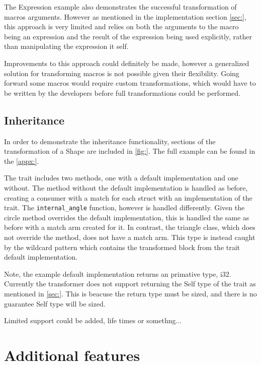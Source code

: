 \documentclass[ oneside,%
                    author={James Elgar},
                    degree={MEng},
                     title={Bidirectional transformer between functional and \\ object-oriented programming in Rust},
                  subtitle={}]{dissertation}
\newcommand{\rust}[1]{\texttt{#1}}
\begin{document}
The Expression example also demonstrates the successful transformation of macros arguments. However as mentioned in the implementation section \autoref{sec:}, this approach is very limited and relies on both the arguments to the macro being an expression and the result of the expression being used explicitly, rather than manipulating the expression it self.

Improvements to this approach could definitely be made, however a generalized solution for transforming macros is not possible given their flexibility. Going forward some macros would require custom transformations, which would have to be written by the developers before full transformations could be performed. 

\subsection{Inheritance}

In order to demonstrate the inheritance functionality, sections of the transformation of a Shape are included in \autoref{fig:}. The full example can be found in the \autoref{appx:}.

The trait includes two methods, one with a default implementation and one without. The method without the default implementation is handled as before, creating a consumer with a match for each struct with an implementation of the trait. The \rust{internal_angle} function, however is handled differently. Given the circle method overrides the default implementation, this is handled the same as before with a match arm created for it. In contrast, the triangle class, which does not override the method, does not have a match arm. This type is instead caught by the wildcard pattern which contains the transformed block from the trait default implementation.   

Note, the example default implementation returns an primative type, i32. Currently the transformer does not support returning the Self type of the trait as mentioned in \autoref{sec:}. This is beacuse the return type must be sized, and there is no guarantee Self type will be sized. 

Limited support could be added, life times or somethng...

\section{Additional features} 
\end{document}
